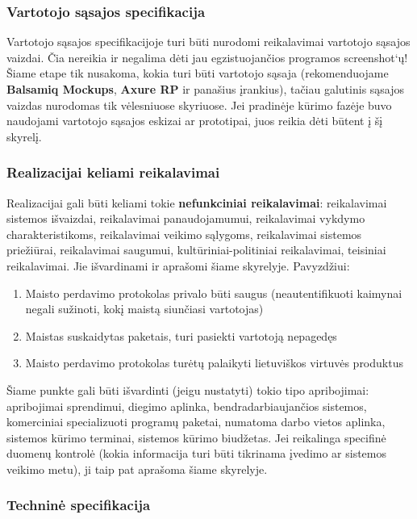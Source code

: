 \documentclass{ktuthesis}
\begin{document}
  \subsubsection{Vartotojo sąsajos specifikacija}

  Vartotojo sąsajos specifikacijoje turi būti nurodomi reikalavimai vartotojo sąsajos vaizdai. Čia nereikia ir negalima dėti jau egzistuojančios programos screenshot‘ų!
  Šiame etape tik nusakoma, kokia turi būti vartotojo sąsaja (rekomenduojame \textbf{Balsamiq Mockups}, \textbf{Axure RP} ir panašius įrankius), tačiau galutinis sąsajos vaizdas
  nurodomas tik vėlesniuose skyriuose. Jei pradinėje kūrimo fazėje buvo naudojami vartotojo sąsajos eskizai ar prototipai, juos reikia dėti būtent į šį skyrelį.

  \subsubsection{Realizacijai keliami reikalavimai}

  Realizacijai gali būti keliami tokie \textbf{nefunkciniai reikalavimai}: reikalavimai sistemos išvaizdai, reikalavimai panaudojamumui, reikalavimai vykdymo charakteristikoms,
  reikalavimai veikimo sąlygoms, reikalavimai sistemos priežiūrai, reikalavimai saugumui, kultūriniai-politiniai reikalavimai, teisiniai reikalavimai. Jie išvardinami
  ir aprašomi šiame skyrelyje. Pavyzdžiui:
  \begin{enumerate}
    \item Maisto perdavimo protokolas privalo būti saugus (neautentifikuoti kaimynai negali sužinoti, kokį maistą siunčiasi vartotojas)
    \item Maistas suskaidytas paketais, turi pasiekti vartotoją nepagedęs
    \item Maisto perdavimo protokolas turėtų palaikyti lietuviškos virtuvės produktus
  \end{enumerate}

  Šiame punkte gali būti išvardinti (jeigu nustatyti) tokio tipo apribojimai: apribojimai sprendimui, diegimo aplinka, bendradarbiaujančios sistemos, komerciniai
  specializuoti programų paketai, numatoma darbo vietos aplinka, sistemos kūrimo terminai, sistemos kūrimo biudžetas. Jei reikalinga specifinė duomenų kontrolė
  (kokia informacija turi būti tikrinama įvedimo ar sistemos veikimo metu), ji taip pat aprašoma šiame skyrelyje.

  \subsubsection{Techninė specifikacija}
\end{document}
